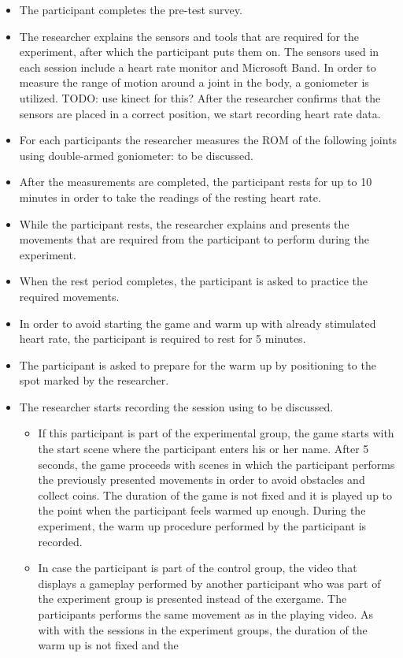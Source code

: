 \begin{itemize}
\item The participant completes the pre-test survey.
\item The researcher explains the sensors and tools that are required for the experiment, after which the participant puts them on. The sensors used in each session include a heart rate monitor and Microsoft Band. In order to measure the range of motion around a joint in the body, a goniometer is utilized. TODO: use kinect for this?%
After the researcher confirms that the sensors are placed in a correct position, we start recording heart rate data. %
\item For each participants the researcher measures the ROM of the following joints using double-armed goniometer: to be discussed. %
\item After the measurements are completed, the participant rests for up to 10 minutes in order to take the readings of the resting heart rate. 
\item While the participant rests, the researcher explains and presents the movements that are required from the participant to perform during the experiment.
\item When the rest period completes, the participant is asked to practice the required movements.
\item In order to avoid starting the game and warm up with already stimulated heart rate, the participant is required to rest for 5 minutes. 
\item The participant is asked to prepare for the warm up by positioning to the spot marked by the researcher.
\item The researcher starts recording the session using to be discussed.
\begin{itemize}
\item  If this participant is part of the experimental group, the game starts with the start scene where the participant enters his or her name. After 5 seconds, the game proceeds with scenes in which the participant performs the previously presented movements in order to avoid obstacles and collect coins. The duration of the game is not fixed and it is played up to the point when the participant feels warmed up enough. During the experiment, the warm up procedure performed by the participant is recorded. %
\item  In case the participant is part of the control group, the video that displays a gameplay performed by another participant who was part of the experiment group is presented instead of the exergame. The participants performs the same movement as in the playing video. As with with the sessions in the experiment groups, the duration of the warm up is not fixed and the 

\end{itemize}
\end{itemize}
